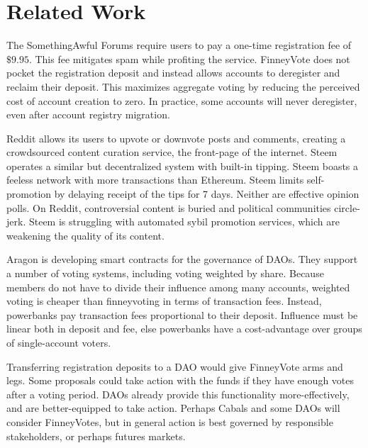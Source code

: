 \documentclass{article}
\begin{document}
\section{Related Work}
The SomethingAwful Forums require users to pay a one-time registration fee of $\$9.95$.
This fee mitigates spam while profiting the service.
FinneyVote does not pocket the registration deposit and instead allows accounts to deregister and reclaim their deposit.
This maximizes aggregate voting by reducing the perceived cost of account creation to zero.
In practice, some accounts will never deregister, even after account registry migration.
\par
Reddit allows its users to upvote or downvote posts and comments, creating a crowdsourced content curation service, the front-page of the internet.
Steem operates a similar but decentralized system with built-in tipping.
Steem boasts a feeless network with more transactions than Ethereum.
Steem limits self-promotion by delaying receipt of the tips for 7 days.
Neither are effective opinion polls.
On Reddit, controversial content is buried and political communities circle-jerk.
Steem is struggling with automated sybil promotion services, which are weakening the quality of its content.
\par
Aragon is developing smart contracts for the governance of DAOs.
They support a number of voting systems, including voting weighted by share.
Because members do not have to divide their influence among many accounts, weighted voting is cheaper than finneyvoting in terms of transaction fees.
Instead, powerbanks pay transaction fees proportional to their deposit.
Influence must be linear both in deposit and fee, else powerbanks have a cost-advantage over groups of single-account voters.
\par
Transferring registration deposits to a DAO would give FinneyVote arms and legs.
Some proposals could take action with the funds if they have enough votes after a voting period.
DAOs already provide this functionality more-effectively, and are better-equipped to take action.
Perhaps Cabals and some DAOs will consider FinneyVotes, but in general action is best governed by responsible stakeholders, or perhaps futures markets.
\end{document}
